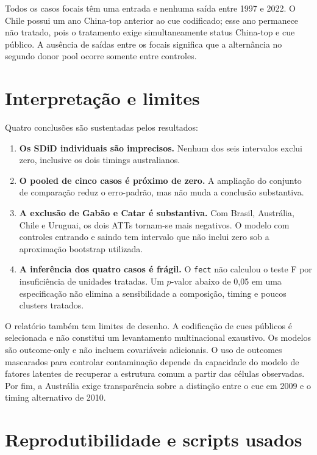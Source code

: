 \documentclass[
  brazilian,
  11pt,
]{article}
\providecommand{\tightlist}{%
  \setlength{\itemsep}{0pt}\setlength{\parskip}{0pt}}
\begin{document}
Todos os casos focais têm uma entrada e nenhuma saída entre 1997 e 2022.
O Chile possui um ano China-top anterior ao cue codificado; esse ano
permanece não tratado, pois o tratamento exige simultaneamente status
China-top e cue público. A ausência de saídas entre os focais significa
que a alternância no segundo donor pool ocorre somente entre controles.

\section{Interpretação e limites}\label{interpretauxe7uxe3o-e-limites}

Quatro conclusões são sustentadas pelos resultados:

\begin{enumerate}
\def\labelenumi{\arabic{enumi}.}
\tightlist
\item
  \textbf{Os SDiD individuais são imprecisos.} Nenhum dos seis
  intervalos exclui zero, inclusive os dois timings australianos.
\item
  \textbf{O pooled de cinco casos é próximo de zero.} A ampliação do
  conjunto de comparação reduz o erro-padrão, mas não muda a conclusão
  substantiva.
\item
  \textbf{A exclusão de Gabão e Catar é substantiva.} Com Brasil,
  Austrália, Chile e Uruguai, os dois ATTs tornam-se mais negativos. O
  modelo com controles entrando e saindo tem intervalo que não inclui
  zero sob a aproximação bootstrap utilizada.
\item
  \textbf{A inferência dos quatro casos é frágil.} O \texttt{fect} não
  calculou o teste F por insuficiência de unidades tratadas. Um
  \(p\)-valor abaixo de 0,05 em uma especificação não elimina a
  sensibilidade a composição, timing e poucos clusters tratados.
\end{enumerate}

O relatório também tem limites de desenho. A codificação de cues
públicos é selecionada e não constitui um levantamento multinacional
exaustivo. Os modelos são outcome-only e não incluem covariáveis
adicionais. O uso de outcomes mascarados para controlar contaminação
depende da capacidade do modelo de fatores latentes de recuperar a
estrutura comum a partir das células observadas. Por fim, a Austrália
exige transparência sobre a distinção entre o cue em 2009 e o timing
alternativo de 2010.

\section{Reprodutibilidade e scripts
usados}\label{reprodutibilidade-e-scripts-usados}
\end{document}
